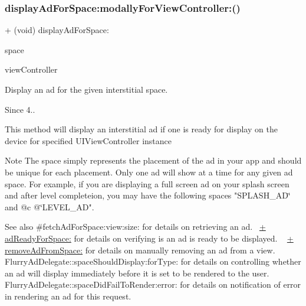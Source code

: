 \subsubsection{\texorpdfstring{display\+Ad\+For\+Space\+:modally\+For\+View\+Controller\+:()}{displayAdForSpace:modallyForViewController:()}}
{\footnotesize\ttfamily + (void) display\+Ad\+For\+Space\+: \begin{DoxyParamCaption}\item[{(N\+S\+String $\ast$)}]{space }\item[{modallyForViewController:(U\+I\+View\+Controller $\ast$)}]{view\+Controller }\end{DoxyParamCaption}}



Display an ad for the given interstitial {\ttfamily space}. 

\begin{DoxySince}{Since}
4..
\end{DoxySince}
This method will display an interstitial ad if one is ready for display on the device for specified U\+I\+View\+Controller instance

\begin{DoxyNote}{Note}
The {\ttfamily space} simply represents the placement of the ad in your app and should be unique for each placement. Only one ad will show at a time for any given ad space. For example, if you are displaying a full screen ad on your splash screen and after level completeion, you may have the following spaces {\ttfamily "S\+P\+L\+A\+S\+H\+\_\+\+AD\char`\"{} and @c @\char`\"{}L\+E\+V\+E\+L\+\_\+\+AD"}.
\end{DoxyNote}
\begin{DoxySeeAlso}{See also}
\#fetch\+Ad\+For\+Space\+:view\+:size\+: for details on retrieving an ad.~\newline
 \hyperlink{interfaceFlurryAds_a1f87cd568f71e77a9c89264b165d2164}{+ ad\+Ready\+For\+Space\+:} for details on verifying is an ad is ready to be displayed. ~\newline
 \hyperlink{interfaceFlurryAds_aaf30e23048de55a1adb8a2c067428be6}{+ remove\+Ad\+From\+Space\+:} for details on manually removing an ad from a view. ~\newline
 Flurry\+Ad\+Delegate\+::space\+Should\+Display\+:for\+Type\+: for details on controlling whether an ad will display immediately before it is set to be rendered to the user. Flurry\+Ad\+Delegate\+::space\+Did\+Fail\+To\+Render\+:error\+: for details on notification of error in rendering an ad for this request.
\end{DoxySeeAlso}

